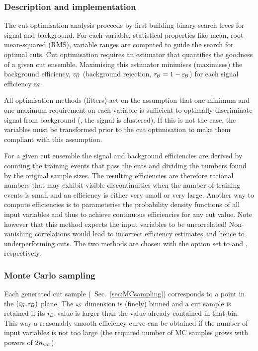 \subsubsection{Description and implementation}

The cut optimisation analysis proceeds by first building binary search trees for 
signal and background. For each variable, statistical properties like mean, 
root-mean-squared (RMS), variable ranges are computed to guide the search 
for optimal cuts. Cut optimisation requires an estimator that quantifies the goodness
of a given cut ensemble. Maximising this estimator minimises (maximises)
the background efficiency, $ \varepsilon_{\!B}$ (background rejection, $ r_{\!B}=1- \varepsilon_{\!B}$) for 
each signal efficiency $ \varepsilon_{\!S}$. 

All optimisation methods (fitters) act on the assumption
that one minimum and one maximum requirement on each variable is sufficient 
to optimally discriminate signal from background (\ie, the signal is clustered).
If this is not the case, the variables must be transformed prior to the cut 
optimisation to make them compliant with this assumption.

For a given cut ensemble the signal and background efficiencies 
are derived by counting the training events that pass the cuts and dividing
the numbers found by the original sample sizes.
The resulting efficiencies are therefore rational numbers that may exhibit
visible discontinuities when the number of training events is small and an
efficiency is either very small or very large. Another way to compute efficiencies
is to parameterise the probability density functions of all input variables
and thus to achieve continuous efficiencies for any cut value. Note however
that this method expects the input variables to be uncorrelated! Non-vanishing
correlations would lead to incorrect efficiency estimates and hence to underperforming
cuts. The two methods are chosen with the option  set to 
and , respectively.

\subsubsection*{Monte Carlo sampling}

Each generated cut sample (\cf\  Sec.~\ref{sec:MCsampling}) corresponds to a 
point in the $( \varepsilon_{\!S}, r_{\!B})$ plane. The $ \varepsilon_{\!S}$ dimension is (finely) binned
and a cut sample is retained if its $ r_{\!B}$ value is larger than the value already
contained in that bin. This way a reasonably smooth efficiency curve can be obtained
if the number of input variables is not too large (the required number of MC samples
grows with powers of $2{n_\text{var}}$). 

